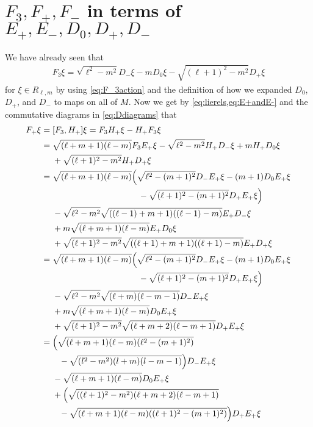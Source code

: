 \section{\texorpdfstring{$F_3,F_+,F_-$ in terms of $E_+,E_-,D_0,D_+,D_-$}{F\_3,F\_+,F\_- in terms of E\_+,E\_-,D\_0,D\_+,D\_-}}\label{sec:Factions}

We have already seen that
\begin{align*}
  F_3 \xi = \sqrt{\ell^2-m^2} D_- \xi - m D_0 \xi - \sqrt{(\ell+1)^2-m^2} D_+ \xi
\end{align*}
for $\xi\in R_{\ell,m}$ by using \cref{eq:F_3action} and the definition of how we expanded $D_0$, $D_+$, and $D_-$ to maps on all of $M$. Now we get by \cref{eq:lierels,eq:E+andE-} and the commutative diagrams in \cref{eq:Ddiagrams} that
\begin{align*}
  F_+ \xi &= [F_3,H_+] \xi = F_3H_+ \xi - H_+F_3 \xi \\
          &= \sqrt{(\ell+m+1)(\ell-m)}F_3E_+ \xi - \sqrt{\ell^2-m^2} H_+D_- \xi + m H_+D_0 \xi \\*
          &\phantom{{}={}}{} + \sqrt{(\ell+1)^2-m^2} H_+D_+ \xi \\
          &= \sqrt{(\ell+m+1)(\ell-m)}\Bigl( \sqrt{\ell^2-(m+1)^2} D_-E_+ \xi - (m+1) D_0E_+ \xi \\*
          &\phantom{{}={}\sqrt{(\ell+m+1)(\ell-m)}()}{} - \sqrt{(\ell+1)^2-(m+1)^2} D_+E_+ \xi \Bigr) \\*
          &\phantom{{}={}}{} - \sqrt{\ell^2-m^2} \sqrt{((\ell-1)+m+1)((\ell-1)-m)} E_+D_- \xi \\*
          &\phantom{{}={}}{} + m \sqrt{(\ell+m+1)(\ell-m)}E_+D_0 \xi \\*
          &\phantom{{}={}}{} + \sqrt{(\ell+1)^2-m^2}\sqrt{((\ell+1)+m+1)((\ell+1)-m)} E_+D_+ \xi \\
          &= \sqrt{(\ell+m+1)(\ell-m)}\Bigl( \sqrt{\ell^2-(m+1)^2} D_-E_+ \xi - (m+1) D_0E_+ \xi \\*
          &\phantom{{}={}\sqrt{(\ell+m+1)(\ell-m)}()}{} - \sqrt{(\ell+1)^2-(m+1)^2} D_+E_+ \xi \Bigr) \\*
          &\phantom{{}={}}{} - \sqrt{\ell^2-m^2} \sqrt{(\ell+m)(\ell-m-1)} D_-E_+ \xi \\*
          &\phantom{{}={}}{} + m \sqrt{(\ell+m+1)(\ell-m)}D_0E_+ \xi \\*
          &\phantom{{}={}}{} + \sqrt{(\ell+1)^2-m^2}\sqrt{(\ell+m+2)(\ell-m+1)} D_+E_+ \xi \\
          &= \Bigl( \sqrt{(\ell+m+1)(\ell-m)(\ell^2-(m+1)^2)} \\*
          &\phantom{{}={}()}{} - \sqrt{(l^2-m^2)(l+m)(l-m-1)} \Bigr)D_-E_+ \xi \\*
          &\phantom{{}={}}{} - \sqrt{(\ell+m+1)(\ell-m)}D_0E_+\xi \\*
          &\phantom{{}={}}{} + \Bigl( \sqrt{((\ell+1)^2-m^2)(\ell+m+2)(\ell-m+1)} \\*
          &\phantom{{}={}()}{} - \sqrt{(\ell+m+1)(\ell-m)((\ell+1)^2-(m+1)^2)}\Bigr)D_+E_+\xi
\end{align*}
